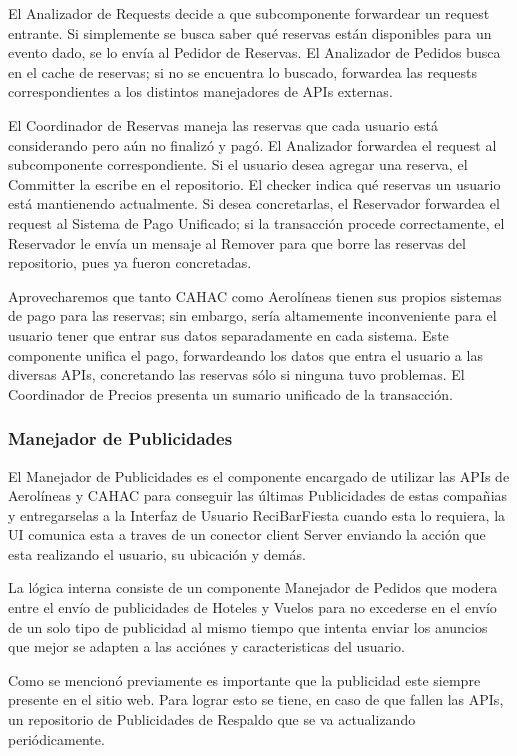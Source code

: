 El Analizador de Requests decide a que subcomponente forwardear un request entrante. Si simplemente se busca saber qué reservas están disponibles para un evento dado, se lo envía al Pedidor de Reservas. El Analizador de Pedidos busca en el cache de reservas; si no se encuentra lo buscado, forwardea las requests correspondientes a los distintos manejadores de APIs externas.

El Coordinador de Reservas maneja las reservas que cada usuario está considerando pero aún no finalizó y pagó. El Analizador forwardea el request al subcomponente correspondiente. Si el usuario desea agregar una reserva, el Committer la escribe en el repositorio. El checker indica qué reservas un usuario está mantienendo actualmente. Si desea concretarlas, el Reservador forwardea el request al Sistema de Pago Unificado; si la transacción procede correctamente, el Reservador le envía un mensaje al Remover para que borre las reservas del repositorio, pues ya fueron concretadas.

Aprovecharemos que  tanto CAHAC como Aerolíneas tienen sus propios sistemas de pago para las reservas; sin embargo, sería altamemente inconveniente para el usuario tener que entrar sus datos separadamente en cada sistema. Este componente unifica el pago, forwardeando los datos que entra el usuario a las diversas APIs, concretando las reservas sólo si ninguna tuvo problemas. El Coordinador de Precios presenta un sumario unificado de la transacción.

\subsubsection{Manejador de Publicidades}

El Manejador de Publicidades es el componente encargado de utilizar las APIs de Aerolíneas y CAHAC para conseguir las últimas Publicidades de estas compañias y entregarselas a la Interfaz de Usuario ReciBarFiesta cuando esta lo requiera, la UI comunica esta a traves de un conector client Server enviando la acción que esta realizando el usuario, su ubicación y demás.

La lógica interna consiste de un componente Manejador de Pedidos que modera entre el envío de publicidades de Hoteles y Vuelos para no excederse en el envío de un solo tipo de publicidad al mismo tiempo que intenta enviar los anuncios que mejor se adapten a las acciónes y caracteristicas del usuario. 

Como se mencionó previamente es importante que la publicidad este siempre presente en el sitio web. Para lograr esto se tiene, en caso de que fallen las APIs, un repositorio de Publicidades de Respaldo que se va actualizando periódicamente.

